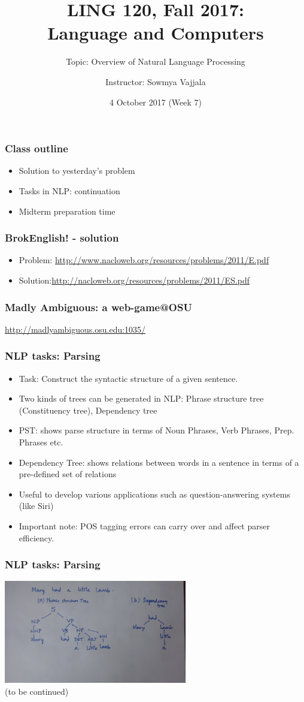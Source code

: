 \documentclass{beamer}
\author[Sowmya Vajjala]{Instructor: Sowmya Vajjala}
\title[LING 120]{LING 120, Fall 2017: \\ Language and Computers}
\subtitle{Topic: Overview of Natural Language Processing}
\date{4 October 2017 (Week 7)}
\institute{Iowa State University, USA}
\begin{document}
\begin{frame}\titlepage
\end{frame}

\begin{frame}%
\frametitle{Class outline}
\begin{itemize}
\item Solution to yesterday's problem
\item Tasks in NLP: continuation
\item Midterm preparation time
\end{itemize}
\end{frame}

\begin{frame}
\frametitle{BrokEnglish! - solution}
\begin{itemize}
\item Problem: \url{http://www.nacloweb.org/resources/problems/2011/E.pdf}
\item Solution:\url{http://nacloweb.org/resources/problems/2011/ES.pdf}
\end{itemize}
\end{frame}


\begin{frame}
\frametitle{Madly Ambiguous: a web-game@OSU}
\url{http://madlyambiguous.osu.edu:1035/}
\end{frame}

\begin{frame}
\frametitle{NLP tasks: Parsing}
\begin{itemize}
\item Task: Construct the syntactic structure of a given sentence.
\item Two kinds of trees can be generated in NLP: Phrase structure tree (Constituency tree), Dependency tree
\item PST: shows parse structure in terms of Noun Phrases, Verb Phrases, Prep. Phrases etc.
\item Dependency Tree: shows relations between words in a sentence in terms of a pre-defined set of relations
\item Useful to develop various applications such as question-answering systems (like Siri)
\item Important note: POS tagging errors can carry over and affect parser efficiency. 
\end{itemize}
\end{frame}

\begin{frame}
\frametitle{NLP tasks: Parsing}
\includegraphics[width=0.6\textwidth,angle=90]{parses.jpg}
\\ \bigskip (to be continued)
\end{frame}
\end{document}
